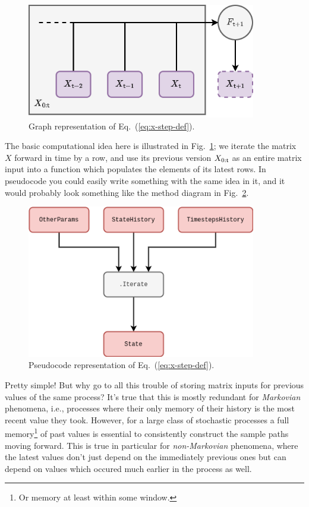 \begin{figure}[h]
\centering
\includegraphics[width=10cm]{images/chapter-1-fundamental-loop.drawio.png}
\caption{Graph representation of Eq.~(\ref{eq:x-step-def}).}
\label{fig:fundamental-loop}
\end{figure}

The basic computational idea here is illustrated in Fig.~\ref{fig:fundamental-loop}; we iterate the matrix $X$ forward in time by a row, and use its previous version $X_{0:{\sf t}}$ as an entire matrix input into a function which populates the elements of its latest rows. In pseudocode you could easily write something with the same idea in it, and it would probably look something like the method diagram in Fig.~\ref{fig:fundamental-loop-code}.

\begin{figure}[h]
\centering
\includegraphics[width=10cm]{images/chapter-1-fundamental-loop-code.drawio.png}
\caption{Pseudocode representation of Eq.~(\ref{eq:x-step-def}).}
\label{fig:fundamental-loop-code}
\end{figure}

Pretty simple! But why go to all this trouble of storing matrix inputs for previous values of the same process? It's true that this is mostly redundant for \emph{Markovian} phenomena, i.e., processes where their only memory of their history is the most recent value they took. However, for a large class of stochastic processes a full memory\footnote{Or memory at least within some window.} of past values is essential to consistently construct the sample paths moving forward. This is true in particular for \emph{non-Markovian} phenomena, where the latest values don't just depend on the immediately previous ones but can depend on values which occured much earlier in the process as well.

